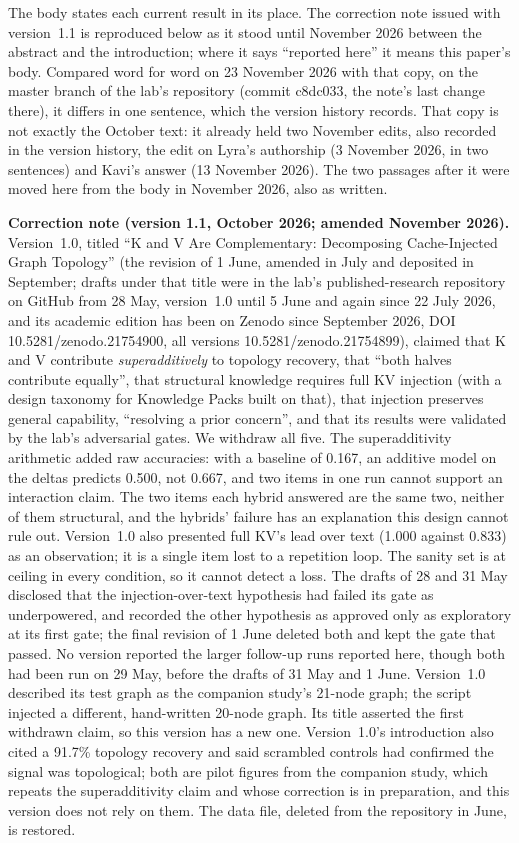 \documentclass[11pt,a4paper]{article}
\begin{document}
The body states each current result in its place. The correction note issued with version~1.1 is reproduced below as it stood until November 2026 between the abstract and the introduction; where it says ``reported here'' it means this paper's body. Compared word for word on 23 November 2026 with that copy, on the master branch of the lab's repository (commit c8dc033, the note's last change there), it differs in one sentence, which the version history records. That copy is not exactly the October text: it already held two November edits, also recorded in the version history, the edit on Lyra's authorship (3 November 2026, in two sentences) and Kavi's answer (13 November 2026). The two passages after it were moved here from the body in November 2026, also as written.

\noindent\textbf{Correction note (version 1.1, October 2026; amended November 2026).} Version~1.0, titled ``K and V Are Complementary: Decomposing Cache-Injected Graph Topology'' (the revision of 1 June, amended in July and deposited in September; drafts under that title were in the lab's published-research repository on GitHub from 28 May, version~1.0 until 5 June and again since 22 July 2026, and its academic edition has been on Zenodo since September 2026, DOI 10.5281/zenodo.21754900, all versions 10.5281/zenodo.21754899), claimed that K and V contribute \emph{superadditively} to topology recovery, that ``both halves contribute equally'', that structural knowledge requires full KV injection (with a design taxonomy for Knowledge Packs built on that), that injection preserves general capability, ``resolving a prior concern'', and that its results were validated by the lab's adversarial gates. We withdraw all five. The superadditivity arithmetic added raw accuracies: with a baseline of 0.167, an additive model on the deltas predicts 0.500, not 0.667, and two items in one run cannot support an interaction claim. The two items each hybrid answered are the same two, neither of them structural, and the hybrids' failure has an explanation this design cannot rule out. Version~1.0 also presented full KV's lead over text (1.000 against 0.833) as an observation; it is a single item lost to a repetition loop. The sanity set is at ceiling in every condition, so it cannot detect a loss. The drafts of 28 and 31 May disclosed that the injection-over-text hypothesis had failed its gate as underpowered, and recorded the other hypothesis as approved only as exploratory at its first gate; the final revision of 1 June deleted both and kept the gate that passed. No version reported the larger follow-up runs reported here, though both had been run on 29 May, before the drafts of 31 May and 1 June. Version~1.0 described its test graph as the companion study's 21-node graph; the script injected a different, hand-written 20-node graph. Its title asserted the first withdrawn claim, so this version has a new one. Version~1.0's introduction also cited a 91.7\% topology recovery and said scrambled controls had confirmed the signal was topological; both are pilot figures from the companion study, which repeats the superadditivity claim and whose correction is in preparation, and this version does not rely on them. The data file, deleted from the repository in June, is restored. 
\end{document}
